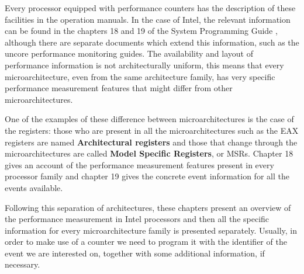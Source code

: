 Every processor equipped with performance counters has the description of these facilities in the operation manuals. In the case of Intel, the relevant information can be found in the chapters 18 and 19 of the System Programming Guide \cite{intel-devguide}, although there are separate documents which extend this information, such as the uncore performance monitoring guides. The availability and layout of performance information is not architecturally uniform, this means that every microarchitecture, even from the same architecture family, has very specific performance measurement features that might differ from other microarchitectures.

One of the examples of these difference between microarchitectures is the case of the registers: those who are present in all the microarchitectures such as the EAX registers are named \textbf{Architectural registers} and those that change through the microarchitectures are called \textbf{Model Specific Registers}, or MSRs. Chapter 18 gives an account of the performance measurement features present in every processor family and chapter 19 gives the concrete event information for all the events available.

Following this separation of architectures, these chapters present an overview of the performance measurement in Intel processors and then all the specific information for every microarchitecture family is presented separately. Usually, in order to make use of a counter we need to program it with the identifier of the event we are interested on, together with some additional information, if necessary.

